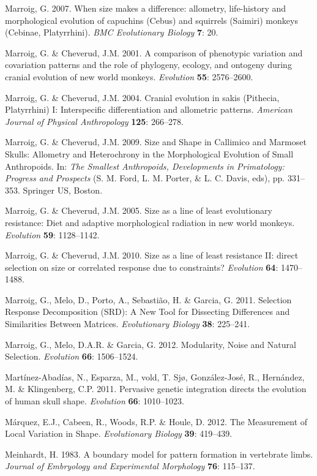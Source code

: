 \documentclass[12pt,twoside]{report}
\begin{document}
Marroig, G. 2007. When size makes a difference: allometry, life-history
and morphological evolution of capuchins (Cebus) and squirrels (Saimiri)
monkeys (Cebinae, Platyrrhini). \emph{BMC Evolutionary Biology}
\textbf{7}: 20.

Marroig, G. \& Cheverud, J.M. 2001. A comparison of phenotypic variation
and covariation patterns and the role of phylogeny, ecology, and
ontogeny during cranial evolution of new world monkeys. \emph{Evolution}
\textbf{55}: 2576--2600.

Marroig, G. \& Cheverud, J.M. 2004. Cranial evolution in sakis
(Pithecia, Platyrrhini) I: Interspecific differentiation and allometric
patterns. \emph{American Journal of Physical Anthropology} \textbf{125}:
266--278.

Marroig, G. \& Cheverud, J.M. 2009. Size and Shape in Callimico and
Marmoset Skulls: Allometry and Heterochrony in the Morphological
Evolution of Small Anthropoids. In: \emph{The Smallest Anthropoids,
Developments in Primatology: Progress and Prospects} (S. M. Ford, L. M.
Porter, \& L. C. Davis, eds), pp. 331--353. Springer US, Boston.

Marroig, G. \& Cheverud, J.M. 2005. Size as a line of least evolutionary
resistance: Diet and adaptive morphological radiation in new world
monkeys. \emph{Evolution} \textbf{59}: 1128--1142.

Marroig, G. \& Cheverud, J.M. 2010. Size as a line of least resistance
II: direct selection on size or correlated response due to constraints?
\emph{Evolution} \textbf{64}: 1470--1488.

Marroig, G., Melo, D., Porto, A., Sebastião, H. \& Garcia, G. 2011.
Selection Response Decomposition (SRD): A New Tool for Dissecting
Differences and Similarities Between Matrices. \emph{Evolutionary
Biology} \textbf{38}: 225--241.

Marroig, G., Melo, D.A.R. \& Garcia, G. 2012. Modularity, Noise and
Natural Selection. \emph{Evolution} \textbf{66}: 1506--1524.

Martínez-Abadías, N., Esparza, M., vold, T. Sjø, González-José, R.,
Hernández, M. \& Klingenberg, C.P. 2011. Pervasive genetic integration
directs the evolution of human skull shape. \emph{Evolution}
\textbf{66}: 1010--1023.

Márquez, E.J., Cabeen, R., Woods, R.P. \& Houle, D. 2012. The
Measurement of Local Variation in Shape. \emph{Evolutionary Biology}
\textbf{39}: 419--439.

Meinhardt, H. 1983. A boundary model for pattern formation in vertebrate
limbs. \emph{Journal of Embryology and Experimental Morphology}
\textbf{76}: 115--137.
\end{document}
